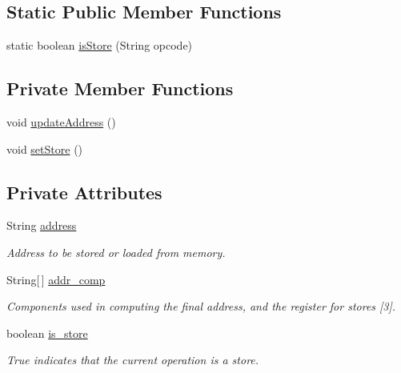 \subsection*{\-Static \-Public \-Member \-Functions}
\begin{DoxyCompactItemize}
\item 
static boolean \hyperlink{classMemStation_a75e3b4382aaa6cc851f89d7f9360dae3}{is\-Store} (\-String opcode)
\end{DoxyCompactItemize}
\subsection*{\-Private \-Member \-Functions}
\begin{DoxyCompactItemize}
\item 
void \hyperlink{classMemStation_a33eea591c23271c00768d3ec9b2eb92d}{update\-Address} ()
\item 
void \hyperlink{classMemStation_afe087bc173ab7dca0674621e42f36aa7}{set\-Store} ()
\end{DoxyCompactItemize}
\subsection*{\-Private \-Attributes}
\begin{DoxyCompactItemize}
\item 
\-String \hyperlink{classMemStation_aeed8a623b07e146133976083b88ae513}{address}
\begin{DoxyCompactList}\small\item\em \-Address to be stored or loaded from memory. \end{DoxyCompactList}\item 
\-String\mbox{[}$\,$\mbox{]} \hyperlink{classMemStation_a26f6ed03957088b12aec6200cf9ccd1e}{addr\-\_\-comp}
\begin{DoxyCompactList}\small\item\em \-Components used in computing the final address, and the register for stores \mbox{[}3\mbox{]}. \end{DoxyCompactList}\item 
boolean \hyperlink{classMemStation_acc8a77b7441e35271230350677d71b8f}{is\-\_\-store}
\begin{DoxyCompactList}\small\item\em \-True indicates that the current operation is a store. \end{DoxyCompactList}\end{DoxyCompactItemize}


